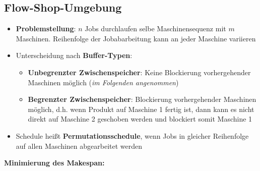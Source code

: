 \subsection{Flow-Shop-Umgebung}
\begin{itemize}
	\item \textbf{Problemstellung}: $n$ Jobs durchlaufen selbe Maschinensequenz mit $m$ Maschinen. Reihenfolge der Jobabarbeitung kann an jeder Maschine variieren
	\item Unterscheidung nach \textbf{Buffer-Typen}:
	\begin{itemize}
		\item \textbf{Unbegrenzter Zwischenspeicher}: Keine Blockierung vorhergehender Maschinen möglich (\textit{im Folgenden angenommen})
		\item \textbf{Begrenzter Zwischenspeicher}: Blockierung vorhergehender Maschinen möglich, d.h. wenn Produkt auf Maschine 1 fertig ist, dann kann es nicht direkt auf Maschine 2 geschoben werden und blockiert somit Maschine 1
	\end{itemize}
	\item Schedule heißt \textbf{Permutationsschedule}, wenn Jobs in gleicher Reihenfolge auf allen Maschinen abgearbeitet werden
\end{itemize}
\pagebreak
\textbf{Minimierung des Makespan:}
